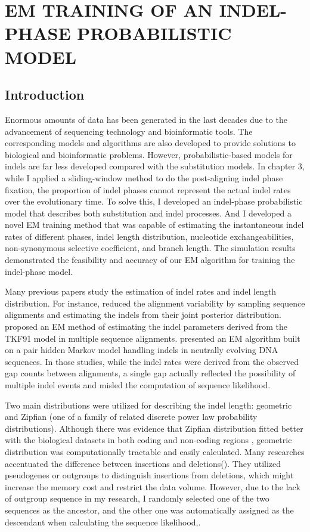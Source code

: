 \chapter{\normalfont EM TRAINING OF AN INDEL-PHASE PROBABILISTIC MODEL}
\label{ch:indel_phase_model}


\section{Introduction}
Enormous amounts of data has been generated in the last decades due to the advancement of sequencing technology and bioinformatic tools. The corresponding models and algorithms are also developed to provide solutions to biological and bioinformatic problems. However, probabilistic-based models for indels are far less developed compared with the substitution models. In chapter 3, while I applied a sliding-window method to do the post-aligning indel phase fixation, the proportion of indel phases cannot represent the actual indel rates over the evolutionary time. To solve this, I developed an indel-phase probabilistic model that describes both substitution and indel processes. And I developed a novel EM training method that was capable of estimating the instantaneous indel rates of different phases,  indel length distribution, nucleotide exchangeabilities, non-synonymous selective coefficient, and branch length. The simulation results demonstrated the feasibility and accuracy of our EM algorithm for training the indel-phase model.

Many previous papers study the estimation of indel rates and indel length distribution. For instance, \cite{metzler2001assessing} reduced the alignment variability by sampling sequence alignments and estimating the indels from their joint posterior distribution. \cite{holmes2005using} proposed an EM method of estimating the indel parameters derived from the TKF91 model in multiple sequence alignments. \cite{cartwright2009problems} presented an EM algorithm built on a pair hidden Markov model handling indels in neutrally evolving DNA sequences. In those studies, while the indel rates were derived from the observed gap counts between alignments, a single gap actually reflected the possibility of multiple indel events and misled the computation of sequence likelihood. 

Two main distributions were utilized for describing the indel length: geometric and Zipfian (one of a family of related discrete power law probability distributions). Although there was evidence that Zipfian distribution fitted better with the biological datasets in both coding \parencite{benner1993empirical} and non-coding regions \parencite{saitou1994evolutionary}, geometric distribution was computationally tractable and easily calculated. Many researches accentuated the difference between insertions and deletions(\cite{tao2007patterns,metzgar2002domain}). They utilized pseudogenes or outgroups to distinguish insertions from deletions, which might increase the memory cost and restrict the data volume. However, due to the lack of outgroup sequence in my research, I randomly selected one of the two sequences as the ancestor, and the other one was automatically assigned as the descendant when calculating the sequence likelihood,. 

